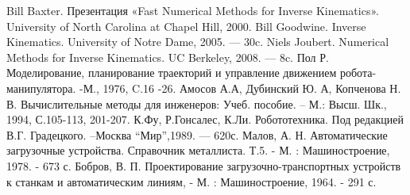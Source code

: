 \documentclass[a4paper,14pt,russian]{extreport} \usepackage{extsizes}
\begin{document}
\begin{thebibliography}{99}
		 Bill Baxter. Презентация «Fast Numerical Methods for Inverse Kinematics». University of North Carolina at Chapel Hill, 2000. 
		 Bill Goodwine. Inverse Kinematics. University of Notre Dame, 2005. — 30c. 
		 Niels Joubert. Numerical Methods for Inverse Kinematics. UC Berkeley, 2008. — 8c. 
		 Пол Р. Моделирование, планирование траекторий и управление движением робота-манипулятора. -М., 1976, C.16 -26. 
		 Амосов А.А, Дубинский Ю. А, Копченова Н. В. Вычислительные методы для инженеров: Учеб. пособие. – М.: Высш. Шк., 1994, С.105-113, 201-207. 
		  К.Фу, Р.Гонсалес, К.Ли. Робототехника. Под редакцией В.Г. Градецкого. –Москва “Мир”,1989. — 620с. 
		  Малов, А. Н. Автоматические загрузочные устройства. Справочник металлиста. Т.5. - М. : Машиностроение, 1978. - 673 с. 
		  Бобров, В. П. Проектирование загрузочно-транспортных устройств к станкам и автоматическим линиям, - М. : Машиностроение, 1964. - 291 с. 
	\end{thebibliography}	
	\newpage
			
	
\end{document}
